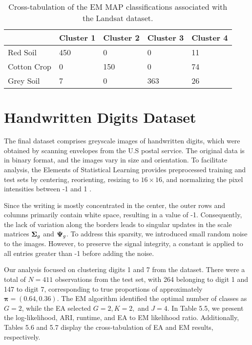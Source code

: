 \documentclass[12pt]{report}
\begin{document}
\begin{table}[!htbp]
  \caption{Cross-tabulation of the EM MAP classifications associated with the Landsat dataset.}
    \vspace{0.5cm}
  \begin{tabularx}{\textwidth}{l *{4}{X}}
  \toprule
   &\textbf{Cluster 1}  & \textbf{Cluster 2}  & \textbf{Cluster 3}  & \textbf{Cluster 4}   \\
  \midrule
  Red Soil & 	450 & 0 & 0 & 11\\
  Cotton Crop &0 & 150 &  0 & 74 \\
   Grey Soil &   7 & 0 &  363  & 26\\
  \bottomrule
  \end{tabularx}
\end{table}

\newpage


\section{Handwritten Digits Dataset}
The final dataset comprises greyscale images of handwritten digits, which were obtained by scanning envelopes from the U.S postal service. The original data is in binary format, and the images vary in size and orientation. To facilitate analysis, the Elements of Statistical Learning provides preprocessed training and test sets by centering, reorienting, resizing to $16 \times 16$, and normalizing the pixel intensities between -1 and 1 \citep{hastie2009}. 

Since the writing is mostly concentrated in the center, the outer rows and columns primarily contain white space, resulting in a value of -1. Consequently, the lack of variation along the borders leads to singular updates in the scale matrices ${\bf \Sigma}_g$ and ${\bf \Psi}_g$. To address this sparsity, we introduced small random noise to the images. However, to preserve the signal integrity, a constant is applied to all entries greater than -1 before adding the noise.

Our analysis focused on clustering digits 1 and 7 from the dataset. There were a total of $N=411$ observations from the test set, with 264 belonging to digit 1 and 147 to digit 7, corresponding to true proportions of approximately $\bm{\pi} = (0.64, 0.36)$. The EM algorithm identified the optimal number of classes as $G=2$, while the EA selected $G=2, K=2,$ and $J=4$. In Table 5.5, we present the log-likelihood, ARI, runtime, and EA to EM likelihood ratio. Additionally, Tables 5.6 and 5.7 display the cross-tabulation of EA and EM results, respectively.
\end{document}
